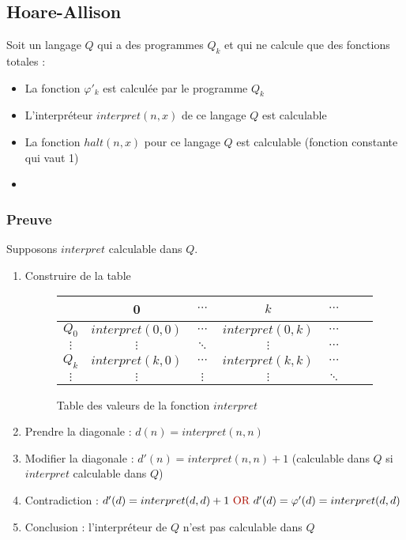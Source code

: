 \newpage
\subsection{Hoare-Allison}

Soit un langage $Q$ qui a des programmes $Q_k$ et qui ne calcule que des fonctions totales :
\begin{itemize}
\item La fonction $\varphi'_k$ est calculée par le programme $Q_k$
\item L'interpréteur $interpret(n,x)$ de ce langage $Q$ est calculable
\item La fonction $halt(n,x)$ pour ce langage $Q$ est calculable (fonction constante qui vaut 1)
\item {}
\end{itemize}

\subsubsection{Preuve}

Supposons $interpret$ calculable dans $Q$.

\begin{enumerate}
\item Construire de la table
	\begin{figure}[H]
    		\centering
    		\begin{tabular}{c|cccccc}
		 & 0 & $\cdots$ & $k$ & $\cdots$ \\ 
		\hline 
		$Q_0$ & $interpret(0,0)$ & $\cdots$ & $interpret(0,k)$ & $\cdots$ \\
		$\vdots$ & $\vdots$ & $\ddots$ & $\vdots$ & $\cdots$ \\ 
		$Q_k$ & $interpret(k,0)$ & $\cdots$ & $interpret(k,k)$ & $\cdots$ \\ 
		$\vdots$ & $\vdots$ & $\vdots$ & $\vdots$ & $\ddots$ \\ 
		\end{tabular}
		\caption{Table des valeurs de la fonction $interpret$}
	\end{figure}
\item Prendre la diagonale : $d(n) = interpret(n,n)$
\item Modifier la diagonale : $d'(n)= interpret(n,n) + 1$ (calculable dans $Q$ si $interpret$ calculable dans $Q$)
\item Contradiction : $d'(d)= interpret(d,d) + 1 \text{ \textred{OR} } d'(d) = \varphi'(d) = interpret(d,d)$
\item Conclusion : l’interpréteur de $Q$ n'est pas calculable dans $Q$
\end{enumerate}

